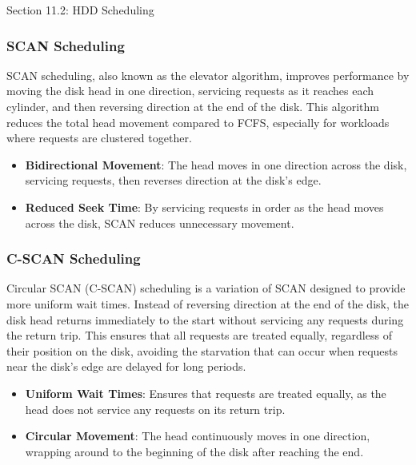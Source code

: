\begin{notes}{Section 11.2: HDD Scheduling}
\begin{highlight}
    \end{highlight}
    
    \subsubsection*{SCAN Scheduling}
    
    SCAN scheduling, also known as the elevator algorithm, improves performance by moving the disk head in one direction, servicing requests as it reaches each cylinder, and then reversing direction at the 
    end of the disk. This algorithm reduces the total head movement compared to FCFS, especially for workloads where requests are clustered together.
    
    \begin{highlight}
    
        \begin{itemize}
            \item \textbf{Bidirectional Movement}: The head moves in one direction across the disk, servicing requests, then reverses direction at the disk's edge.
            \item \textbf{Reduced Seek Time}: By servicing requests in order as the head moves across the disk, SCAN reduces unnecessary movement.
        \end{itemize}
    
    \end{highlight}
    
    \subsubsection*{C-SCAN Scheduling}
    
    Circular SCAN (C-SCAN) scheduling is a variation of SCAN designed to provide more uniform wait times. Instead of reversing direction at the end of the disk, the disk head returns immediately to the 
    start without servicing any requests during the return trip. This ensures that all requests are treated equally, regardless of their position on the disk, avoiding the starvation that can occur when 
    requests near the disk's edge are delayed for long periods.
    
    \begin{highlight}
    
        \begin{itemize}
            \item \textbf{Uniform Wait Times}: Ensures that requests are treated equally, as the head does not service any requests on its return trip.
            \item \textbf{Circular Movement}: The head continuously moves in one direction, wrapping around to the beginning of the disk after reaching the end.
        \end{itemize}
    

\end{highlight}
\end{notes}
